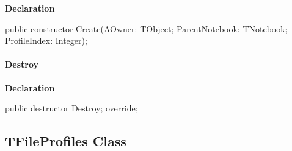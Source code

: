 \documentclass{report}
\newif\ifpdf
\begin{document}
\label{editor.TFileProfile-Create}
\begin{list}{}{
\setlength{\itemindent}{0cm}
\setlength{\listparindent}{0cm}
\setlength{\leftmargin}{\evensidemargin}
\addtolength{\leftmargin}{\tmplength}
\settowidth{\labelsep}{X}
\addtolength{\leftmargin}{\labelsep}
\setlength{\labelwidth}{\tmplength}
}
\item[\textbf{Declaration}\hfill]
\ifpdf
\begin{flushleft}
\fi
\begin{ttfamily}
public constructor Create(AOwner: TObject; ParentNotebook: TNotebook; ProfileIndex: Integer);\end{ttfamily}

\ifpdf
\end{flushleft}
\fi

\end{list}
\paragraph*{Destroy}\hspace*{\fill}

\label{editor.TFileProfile-Destroy}
\begin{list}{}{
\setlength{\itemindent}{0cm}
\setlength{\listparindent}{0cm}
\setlength{\leftmargin}{\evensidemargin}
\addtolength{\leftmargin}{\tmplength}
\settowidth{\labelsep}{X}
\addtolength{\leftmargin}{\labelsep}
\setlength{\labelwidth}{\tmplength}
}
\item[\textbf{Declaration}\hfill]
\ifpdf
\begin{flushleft}
\fi
\begin{ttfamily}
public destructor Destroy; override;\end{ttfamily}

\ifpdf
\end{flushleft}
\fi

\end{list}
\ifpdf
\subsection*{\large{\textbf{TFileProfiles Class}}\normalsize\hspace{1ex}\hrulefill}
\else
\subsection*{TFileProfiles Class}
\fi
\label{editor.TFileProfiles}
\end{document}
